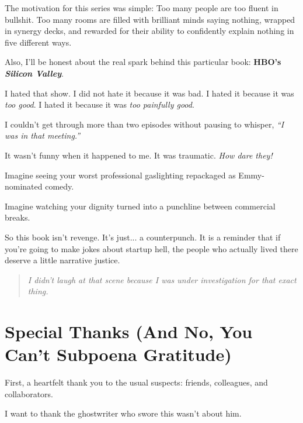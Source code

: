 \documentclass{article}
\begin{document}
  The motivation for this series was simple:
  Too many people are too fluent in bullshit.
  Too many rooms are filled with brilliant minds saying nothing, wrapped in synergy decks, and 
  rewarded for their ability to confidently explain nothing in five different ways.
  
  Also, I'll be honest about the real spark behind this particular book:
  \textbf{HBO’s \textit{Silicon Valley}}.
  
  I hated that show.
  I did not hate it because it was bad.
  I hated it because it was \textit{too good}.  
  I hated it because it was \textit{too painfully good}. 
  
  I couldn’t get through more than two episodes without pausing to whisper, 
  \textit{``I was in that meeting.''}
  
  It wasn’t funny when it happened to me.
  It was traumatic.
  \textit{How dare they!}
  
  Imagine seeing your worst professional gaslighting repackaged as Emmy-nominated comedy.
  
  Imagine watching your dignity turned into a punchline between commercial breaks.
  
  So this book isn’t revenge.
  It’s just... a counterpunch.
  It is a reminder that if you're going to make jokes about startup hell, the people who 
  actually lived there deserve a little narrative justice.
  
  \begin{quote}
  \textit{I didn’t laugh at that scene because I was under investigation for that exact thing.}\\[1ex]
  \noindent
  \begin{flushright}
  \end{flushright}
  \end{quote}

  \section*{Special Thanks (And No, You Can’t Subpoena Gratitude)}

  First, a heartfelt thank you to the usual suspects:  
  friends, colleagues, and collaborators.  

  I want to thank the ghostwriter who swore this wasn't about him.  
\end{document}
